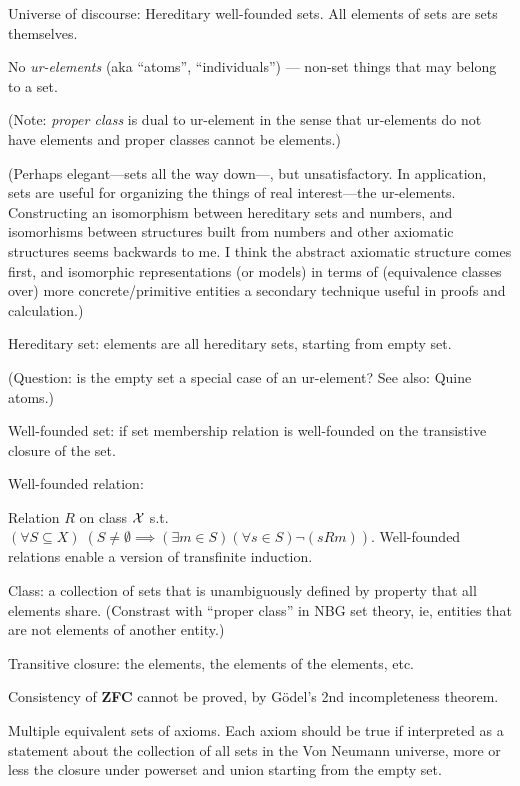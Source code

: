 Universe of discourse: 
Hereditary well-founded sets.
All elements of sets are sets themselves.

No \textsl{ur-elements}\cite{wiki:Urelement} 
(aka ``atoms'', ``individuals'') ---
non-set things that may belong to a set.

(Note: \textsl{proper class} is dual to ur-element in the sense that
ur-elements do not have elements and proper classes cannot be 
elements.)

(Perhaps elegant---sets all the way down---, but unsatisfactory. 
In application, sets are useful for organizing the things
of real interest---the ur-elements.
Constructing an isomorphism between hereditary sets
and numbers, and isomorhisms between structures built
from numbers and other axiomatic structures seems
backwards to me.
I think the abstract axiomatic structure comes first, 
and isomorphic representations (or models) in terms of 
(equivalence classes over) more concrete/primitive
entities a secondary technique useful in proofs and calculation.)

Hereditary set: elements are all hereditary sets, 
starting from empty set\cite{wiki:Hereditary-set}.

(Question: is the empty set a special case of an ur-element?
See also: Quine atoms\cite{wiki:Urelement}.)

Well-founded set: if set membership relation
is well-founded on the transistive closure of the set.

Well-founded relation\cite{wiki:Well-founded-relation}: 
 
Relation $R$ on class $\mathcal{X}$ s.t. 
$(\forall S\subseteq X)
\; \left(S\neq \emptyset \implies 
(\exists m\in S)(\forall s\in S)\lnot (sRm)\right).$
Well-founded relations enable a version of transfinite induction.

Class\cite{wiki:Class-set-theory}:
a collection of sets that is unambiguously defined
by property that all elements share. 
(Constrast with ``proper class'' 
in NBG set theory\cite{wiki:NBG-set-theory},
ie, entities that are not elements of another entity.)

Transitive closure: the elements, the elements of the elements,
etc.

Consistency of \textbf{ZFC} cannot be proved, 
by G\"{o}del's 2nd incompleteness theorem.

Multiple equivalent sets of axioms.
Each axiom should be true if interpreted as a statement about the
collection of all sets in the Von Neumann 
universe\cite{wiki:Von_Neumann_universe},
more or less the closure under powerset and union starting
from the empty set.


